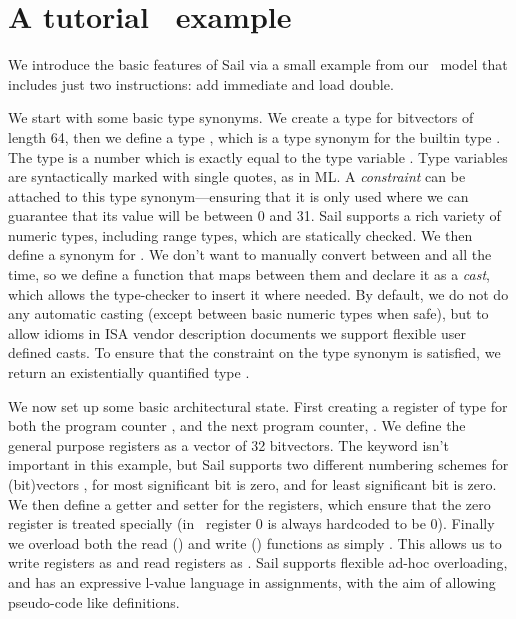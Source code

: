\section{A tutorial \riscv\ example}
\label{sec:riscv}

We introduce the basic features of Sail via a small example from our
\riscv\ model that includes just two instructions: add immediate and
load double.

We start with some basic type synonyms. We create a type 
for bitvectors of length 64, then we define a type , which
is a type synonym for the builtin type . The type
 is a number which is exactly equal to the type variable
. Type variables are syntactically marked with single
quotes, as in ML. A \emph{constraint} can be attached to this type
synonym---ensuring that it is only used where we can guarantee that
its value will be between 0 and 31. Sail supports a rich variety of
numeric types, including range types, which are statically checked. We
then define a synonym  for . We don't want to
manually convert between  and  all the time, so
we define a function that maps between them and declare it as a
\emph{cast}, which allows the type-checker to insert it where
needed. By default, we do not do any automatic casting (except between
basic numeric types when safe), but to allow idioms in ISA vendor
description documents we support flexible user defined casts. To ensure
that the constraint on the  type synonym is satisfied, we
return an existentially quantified type .


We now set up some basic architectural state. First creating a
register of type  for both the program counter , and
the next program counter, . We define the general purpose
registers as a vector of 32  bitvectors. The 
keyword isn't important in this example, but Sail supports two
different numbering schemes for (bit)vectors , for most
significant bit is zero, and  for least significant bit is
zero. We then define a getter and setter for the registers, which
ensure that the zero register is treated specially (in
\riscv\ register 0 is always hardcoded to be 0). Finally we overload
both the read () and write () functions as simply
. This allows us to write registers as  and
read registers as . Sail supports flexible ad-hoc
overloading, and has an expressive l-value language in assignments,
with the aim of allowing pseudo-code like definitions.

